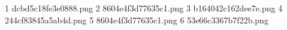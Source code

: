 1 dcbd5c18fe3e0888.png
2 8604e4f3d77635c1.png
3 b164042c162dee7e.png
4 244cf83845a5ab4d.png
5 8604e4f3d77635c1.png
6 53e66c3367b7f22b.png

